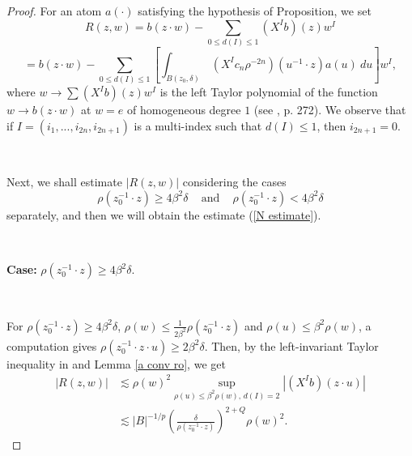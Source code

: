 \documentclass[reqno,10pt]{article}
\theoremstyle{definition}
\numberwithin{equation}{section}
\numberwithin{theorem}{section}
\begin{document}
\begin{proof} For an atom $a(\cdot)$ satisfying the hypothesis of Proposition, we set
\[
R(z, w)= b(z \cdot w) - \sum_{0 \leq d(I) \leq 1} (X^{I}b)(z) w^{I}
\]
\[
=b(z \cdot w) - \sum_{0 \leq d(I) \leq 1} \left[\int_{B(z_0, \delta)} \, (X^{I} c_n\rho^{-2n})(u^{-1} \cdot z) a(u) \ du \right] 
w^I,
\]
where $w \to \sum (X^{I}b)(z) w^{I}$ is the left Taylor polynomial of the function $w \to b(z \cdot w)$ at $w=e$ of homogeneous degree $1$ 
(see \cite{Bonfi}, p. 272). We observe that if $I=(i_1, ..., i_{2n}, i_{2n+1})$ is a multi-index such that 
$d(I) \leq 1$, then $i_{2n+1} = 0$.

\

Next, we shall estimate $|R(z,w)|$ considering the cases 
\[
\rho(z_0^{-1} \cdot z) \geq 4 \beta^2 \delta \,\,\,\,\,\,\, \text{and} \,\,\,\,\,\,\, \rho(z_0^{-1} \cdot z) < 4 \beta^2 \delta
\]
separately, and then we will obtain the estimate (\ref{N estimate}).

\

\textbf{Case:} $\rho(z_0^{-1} \cdot z) \geq 4 \beta^2 \delta$.

\

For $\rho(z_0^{-1} \cdot z) \geq 4 \beta^2 \delta$, $\rho(w) \leq \frac{1}{2 \beta^2} \rho(z_0^{-1} \cdot z)$ and 
$\rho(u) \leq \beta^2 \rho(w)$, a computation gives $\rho(z_0^{-1} \cdot z \cdot u) \geq 2 \beta^2 \delta$. Then, by the left-invariant Taylor inequality in \cite[Corollary 1.44]{Foll-St} and Lemma \ref{a conv ro}, we get
\begin{equation*}
\begin{split}
|R(z, w)| & \lesssim \rho(w)^2 \sup_{\rho(u) \leq \beta^{2}\rho(w), \, d(I)=2} \left|(X^{I} b)( z \cdot u) \right| \\
& \lesssim |B|^{-1/p} \left(\frac{\delta}{\rho(z_0^{-1} \cdot z)}\right)^{2+Q} \rho(w)^{2}.  \label{R1}
\end{split}
\end{equation*}


\end{proof}
\end{document}
